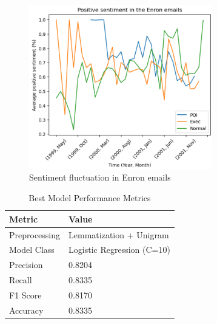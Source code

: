 

\begin{figure}[t]
    \centering
    \includegraphics[width=8cm]{images/sentiment_plot.png}
    \caption{Sentiment fluctuation in Enron emails}
    \label{fig:sentiment}
\end{figure}

\begin{table}[b]
    \centering
    \begin{tabular}{|l|l|}
    \hline
    \textbf{Metric}            & \textbf{Value} \\ \hline
    Preprocessing               & Lemmatization + Unigram \\ \hline
    Model Class                & Logistic Regression (C=10) \\ \hline
    Precision         & 0.8204 \\ \hline
    Recall            & 0.8335 \\ \hline
    F1 Score          & 0.8170 \\ \hline
    Accuracy          & 0.8335 \\ \hline
    \end{tabular}
    \caption{Best Model Performance Metrics}
    \label{tab:best_model_metrics}
\end{table}

